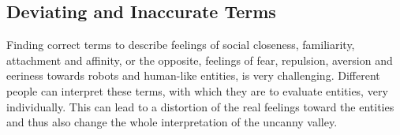\subsection{Deviating and Inaccurate Terms}
Finding correct terms to describe feelings of social closeness, familiarity, attachment and affinity, or the opposite, feelings of fear, repulsion, aversion and eeriness towards robots and human-like entities, is very challenging. Different people can interpret these terms, with which they are to evaluate entities, very individually. This can lead to a distortion of the real feelings toward the entities and thus also change the whole interpretation of the uncanny valley.
\begin{table}
\centering
\setlength{\extrarowheight}{0pt}
\addtolength{\extrarowheight}{\aboverulesep}
\addtolength{\extrarowheight}{\belowrulesep}
\setlength{\aboverulesep}{0pt}
\setlength{\belowrulesep}{0pt}
\end{table}
